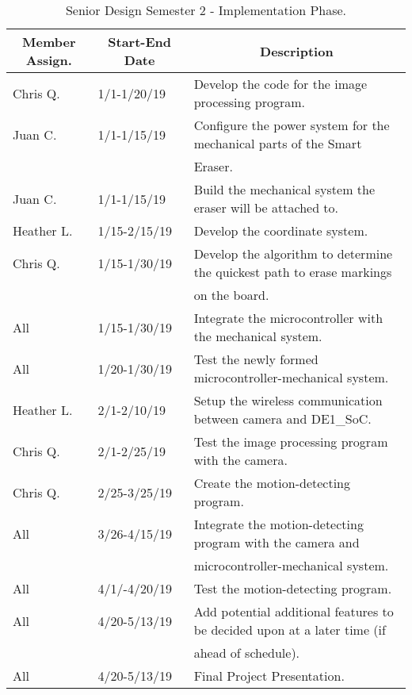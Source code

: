 \begin{table} [H]	
	\normalsize
	\centering
	\begin{tabular}{|l|l|l|}
		\hline
		\multicolumn{1}{|c|}{\textbf{Member Assign.}} & \multicolumn{1}{|c|}{\textbf{Start-End Date}} & \multicolumn{1}{|c|}{\textbf{Description}} \\
		\hline
		Chris Q. & 1/1-1/20/19 & Develop the code for the image processing program. \\
		\hline
		Juan C. & 1/1-1/15/19 & Configure the power system for the mechanical parts of the Smart \\
		& & Eraser. \\
		\hline
		Juan C. & 1/1-1/15/19 & Build the mechanical system the eraser will be attached to.\\
		\hline
		Heather L. & 1/15-2/15/19 & Develop the coordinate system. \\
		\hline
		Chris Q. & 1/15-1/30/19 & Develop the algorithm to determine the quickest path to erase markings \\
		& & on the board.\\
		\hline
		All & 1/15-1/30/19 & Integrate the microcontroller with the mechanical system.\\
		\hline
		All & 1/20-1/30/19 & Test the newly formed microcontroller-mechanical system.\\
		\hline
		Heather L. & 2/1-2/10/19 &
		Setup the wireless communication between camera and DE1\_SoC.\\
		\hline
		Chris Q. & 2/1-2/25/19 & Test the image processing program with the camera.\\
		\hline
		Chris Q. & 2/25-3/25/19 & Create the motion-detecting program.\\
		\hline
		All & 3/26-4/15/19 & Integrate the motion-detecting program with the camera and \\
		& & microcontroller-mechanical system.\\
		\hline
		All & 4/1/-4/20/19 & Test the motion-detecting program.\\
		\hline
		All & 4/20-5/13/19 & 
		Add potential additional features to be decided upon at a later time (if \\
		& & ahead of schedule).\\
		\hline
		All & 4/20-5/13/19 & 
		Final Project Presentation.\\
		\hline
	\end{tabular} 
	\caption{Senior Design Semester 2 - Implementation Phase.}
	\label{table:4}
\end{table}

